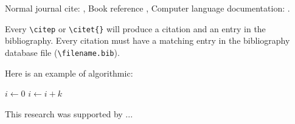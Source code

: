 Normal journal cite: \citep{joursamp1},
 Book reference \citet{booksamp1},
Computer language documentation:
\citep{sampcode2}.

Every \verb+\citep+  or \verb+\citet{}+ will produce a citation and an entry in the
bibliography. Every citation must have a matching entry in the
bibliography
database file (\verb+\filename.bib+).


Here is an example of algorithmic:


\begin{algorithmic}
    \State $i\gets 0$
\Else
        \State $i\gets i+k$
    \EndIf
\EndIf
\end{algorithmic}


\begin{acknowledgments}
This research was supported by  ...
\end{acknowledgments}


